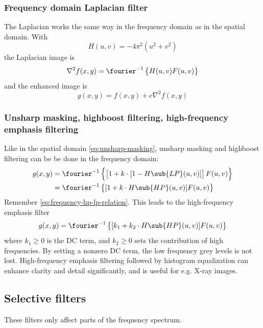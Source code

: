 \subsubsection{Frequency domain Laplacian filter}
The Laplacian works the same way in the frequency domain as in the spatial domain. With
\begin{equation}
    H(u,v) = -4\pi^2(u^2 + v^2)
\end{equation}
the Laplacian image is
\begin{equation}
    \nabla^2 f(x,y) = \fourier^{-1} \left\{ H(u,v) F(u,v) \right\}
\end{equation}
and the enhanced image is
\begin{equation}
    g(x,y) = f(x,y) + c \nabla^2 f(x,y)
\end{equation}

\subsubsection{Unsharp masking, highboost filtering, high-frequency emphasis filtering}
Like in the spatial domain \eqref{eq:unsharp-masking}, unsharp masking and highboost filtering can be be done in the frequency domain:
\begin{equation}
\begin{split}
    g(x,y)
    &=
    \fourier^{-1}
    \left\{
        \left[
            1 + k \cdot [1 - H\sub{LP}(u,v)]
        \right]
        F(u,v)
    \right\} \\
    &=
    \fourier^{-1}
    \left\{
        [1 + k \cdot H\sub{HP}(u,v)] F(u,v)
    \right\}
\end{split}
\end{equation}
Remember \eqref{eq:frequency-hp-lp-relation}. This leads to the high-frequency emphasis filter
\begin{equation}
    g(x,y)
    =
    \fourier^{-1}
    \left\{
        [k_1 + k_2 \cdot H\sub{HP}(u,v)] F(u,v)
    \right\}
\end{equation}
where $k_1 \geq 0$ is the DC term, and $k_2 \geq 0$ sets the contribution of high frequencies. By setting a nonzero DC term, the low frequency grey levels is not lost. High-frequency emphasis filtering followed by histogram equalization can enhance clarity and detail significantly, and is useful for e.g. X-ray images.

\subsection{Selective filters}
These filters only affect parts of the frequency spectrum.

